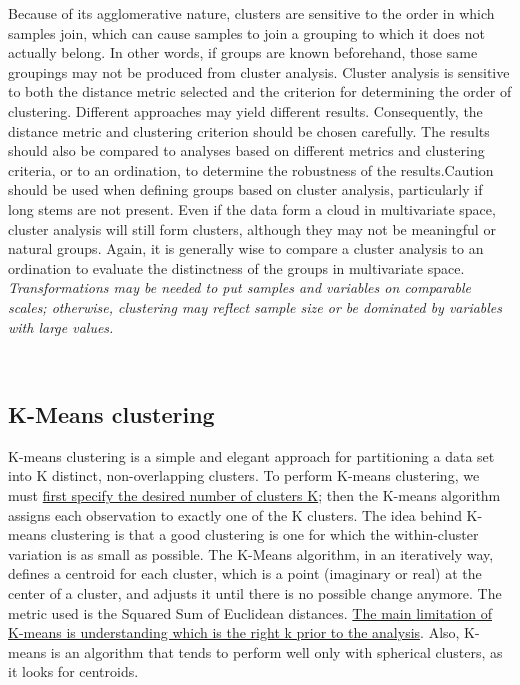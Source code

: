 \documentclass[
]{svmono}
\begin{document}
Because of its agglomerative nature, clusters are sensitive to the order
in which samples join, which can cause samples to join a grouping to
which it does not actually belong. In other words, if groups are known
beforehand, those same groupings may not be produced from cluster
analysis. Cluster analysis is sensitive to both the distance metric
selected and the criterion for determining the order of clustering.
Different approaches may yield different results. Consequently, the
distance metric and clustering criterion should be chosen carefully. The
results should also be compared to analyses based on different metrics
and clustering criteria, or to an ordination, to determine the
robustness of the results.Caution should be used when defining groups
based on cluster analysis, particularly if long stems are not present.
Even if the data form a cloud in multivariate space, cluster analysis
will still form clusters, although they may not be meaningful or natural
groups. Again, it is generally wise to compare a cluster analysis to an
ordination to evaluate the distinctness of the groups in multivariate
space. \emph{Transformations may be needed to put samples and variables on
comparable scales; otherwise, clustering may reflect sample size or be
dominated by variables with large values.}

~

\hypertarget{k-means-clustering}{%
\subsection{K-Means clustering}\label{k-means-clustering}}

K-means clustering is a simple and elegant approach for partitioning a
data set into K distinct, non-overlapping clusters. To perform K-means
clustering, we must \ul{first specify the desired number of clusters
K}; then the K-means algorithm assigns each observation to
exactly one of the K clusters. The idea behind K-means clustering is
that a good clustering is one for which the within-cluster variation is
as small as possible. The K-Means algorithm, in an iteratively way,
defines a centroid for each cluster, which is a point (imaginary or
real) at the center of a cluster, and adjusts it until there is no
possible change anymore. The metric used is the Squared Sum of Euclidean
distances. \ul{The main limitation of K-means is understanding which is the
right k prior to the analysis}. Also, K-means is an
algorithm that tends to perform well only with spherical clusters, as it
looks for centroids.
\end{document}
